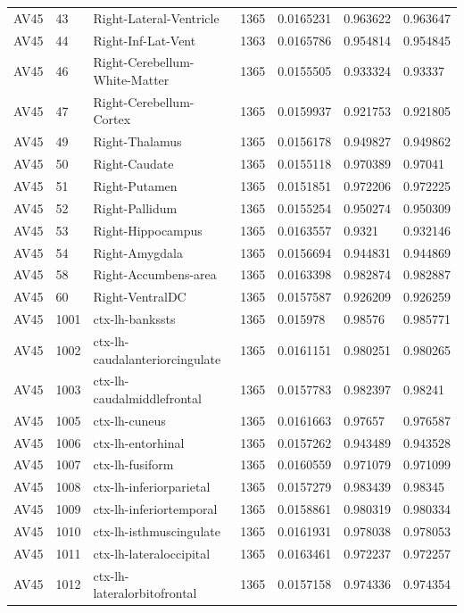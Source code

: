 \begin{landscape}
\begin{longtable}{lllllll}
AV45 & 43 & Right-Lateral-Ventricle & 1365 & 0.0165231 & 0.963622 & 0.963647 \\
AV45 & 44 & Right-Inf-Lat-Vent & 1363 & 0.0165786 & 0.954814 & 0.954845 \\
AV45 & 46 & Right-Cerebellum-White-Matter & 1365 & 0.0155505 & 0.933324 & 0.93337 \\
AV45 & 47 & Right-Cerebellum-Cortex & 1365 & 0.0159937 & 0.921753 & 0.921805 \\
AV45 & 49 & Right-Thalamus & 1365 & 0.0156178 & 0.949827 & 0.949862 \\
AV45 & 50 & Right-Caudate & 1365 & 0.0155118 & 0.970389 & 0.97041 \\
AV45 & 51 & Right-Putamen & 1365 & 0.0151851 & 0.972206 & 0.972225 \\
AV45 & 52 & Right-Pallidum & 1365 & 0.0155254 & 0.950274 & 0.950309 \\
AV45 & 53 & Right-Hippocampus & 1365 & 0.0163557 & 0.9321 & 0.932146 \\
AV45 & 54 & Right-Amygdala & 1365 & 0.0156694 & 0.944831 & 0.944869 \\
AV45 & 58 & Right-Accumbens-area & 1365 & 0.0163398 & 0.982874 & 0.982887 \\
AV45 & 60 & Right-VentralDC & 1365 & 0.0157587 & 0.926209 & 0.926259 \\
AV45 & 1001 & ctx-lh-bankssts & 1365 & 0.015978 & 0.98576 & 0.985771 \\
AV45 & 1002 & ctx-lh-caudalanteriorcingulate & 1365 & 0.0161151 & 0.980251 & 0.980265 \\
AV45 & 1003 & ctx-lh-caudalmiddlefrontal & 1365 & 0.0157783 & 0.982397 & 0.98241 \\
AV45 & 1005 & ctx-lh-cuneus & 1365 & 0.0161663 & 0.97657 & 0.976587 \\
AV45 & 1006 & ctx-lh-entorhinal & 1365 & 0.0157262 & 0.943489 & 0.943528 \\
AV45 & 1007 & ctx-lh-fusiform & 1365 & 0.0160559 & 0.971079 & 0.971099 \\
AV45 & 1008 & ctx-lh-inferiorparietal & 1365 & 0.0157279 & 0.983439 & 0.98345 \\
AV45 & 1009 & ctx-lh-inferiortemporal & 1365 & 0.0158861 & 0.980319 & 0.980334 \\
AV45 & 1010 & ctx-lh-isthmuscingulate & 1365 & 0.0161931 & 0.978038 & 0.978053 \\
AV45 & 1011 & ctx-lh-lateraloccipital & 1365 & 0.0163461 & 0.972237 & 0.972257 \\
AV45 & 1012 & ctx-lh-lateralorbitofrontal & 1365 & 0.0157158 & 0.974336 & 0.974354 \\

\end{longtable}
\end{landscape}
